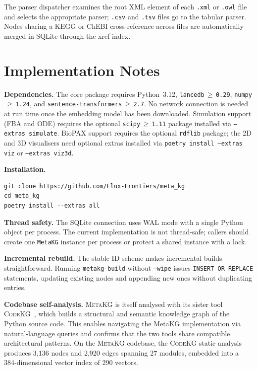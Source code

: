 \documentclass[10pt]{article}
\begin{document}
The parser dispatcher examines the root XML element of each \texttt{.xml} or
\texttt{.owl} file and selects the appropriate parser; \texttt{.csv} and
\texttt{.tsv} files go to the tabular parser. Nodes sharing a KEGG or ChEBI
cross-reference across files are automatically merged in SQLite through the
xref index.

\section{Implementation Notes}
\label{sec:impl}

\textbf{Dependencies.} The core package requires Python~3.12,
\texttt{lancedb$\,\geq\,$0.29}, \texttt{numpy$\,\geq\,$1.24}, and
\texttt{sentence-transformers$\,\geq\,$2.7}. No network connection is needed
at run time once the embedding model has been downloaded. Simulation support
(FBA and ODE) requires the optional \texttt{scipy$\,\geq\,$1.11} package
installed via \texttt{--extras simulate}. BioPAX support requires the optional
\texttt{rdflib} package; the 2D and 3D visualisers need optional extras
installed via \texttt{poetry install --extras viz} or \texttt{--extras viz3d}.

\textbf{Installation.}

\begin{lstlisting}[style=bash]
git clone https://github.com/Flux-Frontiers/meta_kg
cd meta_kg
poetry install --extras all
\end{lstlisting}

\textbf{Thread safety.} The SQLite connection uses WAL mode with a single
Python object per process. The current implementation is not thread-safe;
callers should create one \texttt{MetaKG} instance per process or protect a
shared instance with a lock.

\textbf{Incremental rebuild.} The stable ID scheme makes incremental builds
straightforward. Running \texttt{metakg-build} without \texttt{--wipe} issues
\texttt{INSERT OR REPLACE} statements, updating existing nodes and appending
new ones without duplicating entries.

\textbf{Codebase self-analysis.} \textsc{MetaKG} is itself analysed with its
sister tool \textsc{CodeKG}~\citep{fluxfrontiers2025codekg}, which builds a
structural and semantic knowledge graph of the Python source code. This
enables navigating the MetaKG implementation via natural-language queries and
confirms that the two tools share compatible architectural patterns. On the
\textsc{MetaKG} codebase, the \textsc{CodeKG} static analysis produces 3,136
nodes and 2,920 edges spanning 27 modules, embedded into a 384-dimensional
vector index of 290 vectors.
\end{document}

